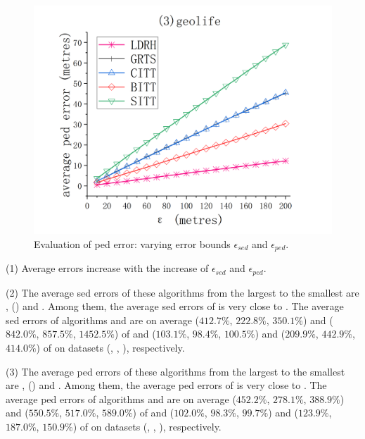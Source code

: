 {{\begin{figure}[tb!]
	\includegraphics[scale = 0.210]{figures/Fig-geolife-ped-error.png}\hspace{1ex}
	\caption{\small Evaluation of ped error: varying error bounds $\epsilon_{sed}$ and $\epsilon_{ped}$.}
	\label{fig:ped-error}
\end{figure}

\ni (1) Average errors increase with the increase of $\epsilon_{sed}$ and $\epsilon_{ped}$.

\ni (2) The average sed errors of these algorithms from the largest to the smallest are \sitt, \grts (\citt) and \ldrh. Among them, the average sed errors of \citt is very close to \grts.
The average sed errors of algorithms \citt and \sitt are on average
($412.7\%$, $222.8\%$, $350.1\%$)
and ($842.0\%$, $857.5\%$, $1452.5\%$)
of \ldrh and ($103.1\%$, $98.4\%$, $100.5\%$) and
($209.9\%$, $442.9\%$, $414.0\%$)
of \grts on datasets (\mopsi, \sercar, \geolife), respectively.

\ni (3) The average ped errors of these algorithms from the largest to the smallest are \sitt, \grts (\citt) and \ldrh. Among them, the average ped errors of \citt is very close to \grts.
The average ped errors of algorithms \citt and \sitt are on average
($452.2\%$, $278.1\%$, $388.9\%$)
and ($550.5\%$, $517.0\%$, $589.0\%$)
of \ldrh and ($102.0\%$, $98.3\%$, $99.7\%$) and
($123.9\%$, $187.0\%$, $150.9\%$)
of \grts on datasets (\mopsi, \sercar, \geolife), respectively.

}}
